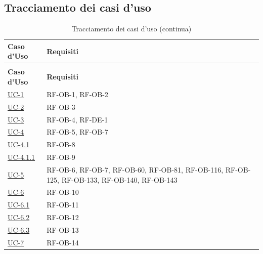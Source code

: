 \documentclass[a4paper,12pt]{article}
\begin{document}
\subsection{Tracciamento dei casi d'uso} \label{subsection:tracciamento_uc}
\begin{center}
\renewcommand{\arraystretch}{1.5}

\begin{longtable}{|>{\centering\arraybackslash}p{5cm}|>{\centering\arraybackslash}p{9cm}|}

\hline
\rowcolor{gray!60}
\textbf{Caso d'Uso} & \textbf{Requisiti} \\
\hline
\endfirsthead
\caption[]{Tracciamento dei casi d'uso (continua)} \\
\hline
\rowcolor{gray!60}
\textbf{Caso d'Uso} & \textbf{Requisiti} \\
\hline
\endhead

\hyperref[subsec:UC-1]{UC-1} & RF-OB-1, RF-OB-2 \\
\hline

\hyperref[subsec:UC-2]{UC-2} & RF-OB-3 \\
\hline

\hyperref[subsec:UC-3]{UC-3} & RF-OB-4, RF-DE-1 \\
\hline

\hyperref[sec:UC-4]{UC-4} & RF-OB-5, RF-OB-7 \\
\hline

\hyperref[subsec:UC-4.1]{UC-4.1} & RF-OB-8 \\
\hline

\hyperref[subsec:UC-4.1.1]{UC-4.1.1} & RF-OB-9 \\
\hline

\hyperref[sec:UC-5]{UC-5} & RF-OB-6, RF-OB-7, RF-OB-60, RF-OB-81, RF-OB-116, RF-OB-125, RF-OB-133, RF-OB-140, RF-OB-143 \\
\hline

\hyperref[subsec:UC-6]{UC-6} & RF-OB-10 \\
\hline

\hyperref[subsec:UC-6.1]{UC-6.1} & RF-OB-11 \\
\hline

\hyperref[subsec:UC-6.2]{UC-6.2} & RF-OB-12 \\
\hline

\hyperref[subsec:UC-6.3]{UC-6.3} & RF-OB-13 \\
\hline

\hyperref[subsec:UC-7]{UC-7} & RF-OB-14 \\
\hline


\end{longtable}
\end{center}
\end{document}
